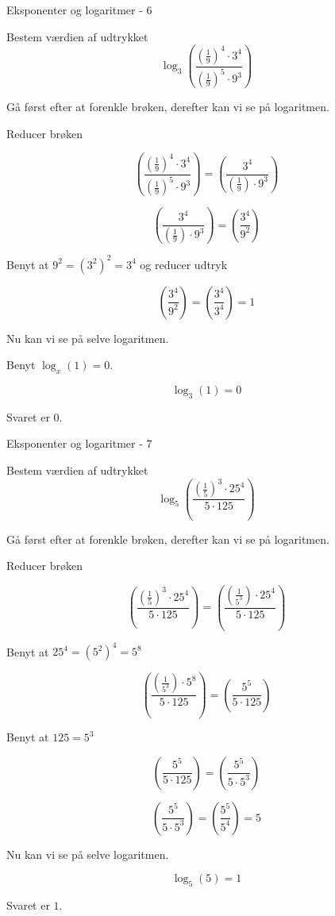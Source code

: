 \documentclass{article}
\begin{document}
\newpage
\begin{exercise}{Eksponenter og logaritmer - 6}

Bestem værdien af udtrykket
\[
\log_3\left(\frac{\left(\frac{1}{9}\right)^4 \cdot 3^4}{\left(\frac{1}{9}\right)^5 \cdot 9^3} \right)
\]


\hint
Gå først efter at forenkle brøken, derefter kan vi se på logaritmen.

\hint
Reducer brøken

\hint
\[
\left(\frac{\left(\frac{1}{9}\right)^4 \cdot 3^4}{\left(\frac{1}{9}\right)^5 \cdot 9^3} \right) =
\left(\frac{3^4}{\left(\frac{1}{9}\right) \cdot 9^3} \right)
\]

\hint
\[
\left(\frac{3^4}{\left(\frac{1}{9}\right) \cdot 9^3} \right) =
\left(\frac{3^4}{9^2} \right)
\]


\hint
Benyt at $9^2=(3^2)^2 = 3^4$ og reducer udtryk

\hint
\[
\left(\frac{3^4}{9^2} \right) =
\left(\frac{3^4}{3^4} \right) = 1
\]


\hint
Nu kan vi se på selve logaritmen.

\hint
Benyt $\log_x (1) = 0$.

\hint
\[
\log_3\left(1 \right) = 0
\]


\hint
Svaret er $0$.

\end{exercise}

\newpage
\begin{exercise}{Eksponenter og logaritmer - 7}

Bestem værdien af udtrykket
\[
\log_5\left(\frac{\left(\frac{1}{5}\right)^3 \cdot 25^4}{5 \cdot 125} \right)
\]


\hint
Gå først efter at forenkle brøken, derefter kan vi se på logaritmen.

\hint
Reducer brøken

\hint
\[
\left(\frac{\left(\frac{1}{5}\right)^3 \cdot 25^4}{5 \cdot 125} \right) =
\left(\frac{\left(\frac{1}{5^3}\right) \cdot 25^4}{5 \cdot 125} \right)
\]

\hint
Benyt at $25^4 = (5^2)^4 = 5^8$

\hint
\[
\left(\frac{\left(\frac{1}{5^3}\right) \cdot 5^8}{5 \cdot 125} \right) =
\left(\frac{5^5}{5 \cdot 125} \right)
\]

\hint
Benyt at $125 = 5^3$

\hint
\[
\left(\frac{5^5}{5 \cdot 125} \right) = \left(\frac{5^5}{5 \cdot 5^3} \right)
\]

\hint
\[
\left(\frac{5^5}{5 \cdot 5^3} \right) = \left(\frac{5^5}{5^4} \right) = 5
\]


\hint
Nu kan vi se på selve logaritmen.

\hint
\[
\log_5\left(5\right) = 1
\]


\hint
Svaret er $1$.

\end{exercise}
\end{document}
